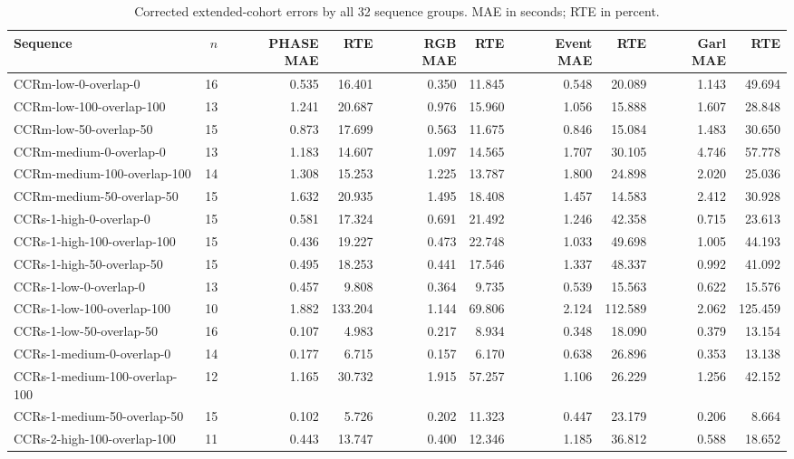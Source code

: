 \begingroup\scriptsize\setlength{\tabcolsep}{3pt}
\begin{longtable}{lrrrrrrrrr}
\caption{Corrected extended-cohort errors by all 32 sequence groups. MAE in seconds; RTE in percent.}\label{tab:audit-transfer-sequences}\\
\toprule
Sequence & $n$ & PHASE MAE & RTE & RGB MAE & RTE & Event MAE & RTE & Garl MAE & RTE \\
\midrule
CCRm-low-0-overlap-0 & 16 & 0.535 & 16.401 & 0.350 & 11.845 & 0.548 & 20.089 & 1.143 & 49.694 \\
CCRm-low-100-overlap-100 & 13 & 1.241 & 20.687 & 0.976 & 15.960 & 1.056 & 15.888 & 1.607 & 28.848 \\
CCRm-low-50-overlap-50 & 15 & 0.873 & 17.699 & 0.563 & 11.675 & 0.846 & 15.084 & 1.483 & 30.650 \\
CCRm-medium-0-overlap-0 & 13 & 1.183 & 14.607 & 1.097 & 14.565 & 1.707 & 30.105 & 4.746 & 57.778 \\
CCRm-medium-100-overlap-100 & 14 & 1.308 & 15.253 & 1.225 & 13.787 & 1.800 & 24.898 & 2.020 & 25.036 \\
CCRm-medium-50-overlap-50 & 15 & 1.632 & 20.935 & 1.495 & 18.408 & 1.457 & 14.583 & 2.412 & 30.928 \\
CCRs-1-high-0-overlap-0 & 15 & 0.581 & 17.324 & 0.691 & 21.492 & 1.246 & 42.358 & 0.715 & 23.613 \\
CCRs-1-high-100-overlap-100 & 15 & 0.436 & 19.227 & 0.473 & 22.748 & 1.033 & 49.698 & 1.005 & 44.193 \\
CCRs-1-high-50-overlap-50 & 15 & 0.495 & 18.253 & 0.441 & 17.546 & 1.337 & 48.337 & 0.992 & 41.092 \\
CCRs-1-low-0-overlap-0 & 13 & 0.457 & 9.808 & 0.364 & 9.735 & 0.539 & 15.563 & 0.622 & 15.576 \\
CCRs-1-low-100-overlap-100 & 10 & 1.882 & 133.204 & 1.144 & 69.806 & 2.124 & 112.589 & 2.062 & 125.459 \\
CCRs-1-low-50-overlap-50 & 16 & 0.107 & 4.983 & 0.217 & 8.934 & 0.348 & 18.090 & 0.379 & 13.154 \\
CCRs-1-medium-0-overlap-0 & 14 & 0.177 & 6.715 & 0.157 & 6.170 & 0.638 & 26.896 & 0.353 & 13.138 \\
CCRs-1-medium-100-overlap-100 & 12 & 1.165 & 30.732 & 1.915 & 57.257 & 1.106 & 26.229 & 1.256 & 42.152 \\
CCRs-1-medium-50-overlap-50 & 15 & 0.102 & 5.726 & 0.202 & 11.323 & 0.447 & 23.179 & 0.206 & 8.664 \\
CCRs-2-high-100-overlap-100 & 11 & 0.443 & 13.747 & 0.400 & 12.346 & 1.185 & 36.812 & 0.588 & 18.652 \\

\end{longtable}
